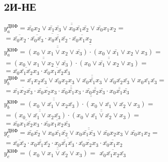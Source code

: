 \documentclass{bmstu}
\begin{document}
	\subsection{2И-НЕ}	
	$y^{\text{ДНФ}}_a = \overline{\overline{\bar{x_0} x_2 \vee \bar{x_1} \bar{x_3} \vee x_0 \bar{x_1} \bar{x_2} \vee \bar{x_0} x_1 x_2}} =$ \\
	$= \overline{\overline{\bar{x_0} x_2} \cdot \overline{\bar{x_0} \bar{x_3}} \cdot \overline{x_0 \bar{x_1} \bar{x_2}} \cdot \overline{\bar{x_0} x_1 x_2}}$ \\
	$y^{\text{КНФ}}_a = \overline{\overline{\overline{\overline{(x_0 \vee x_1 \vee x_2 \vee \bar{x_3})}} \cdot (x_0 \vee \bar{x_1} \vee x_2 \vee x_3)}} = $ \\
	$= \overline{\overline{(x_0 \vee x_1 \vee x_2 \vee \bar{x_3})}} \cdot \overline{\overline{(x_0 \vee \bar{x_1} \vee x_2 \vee x_3)}} = $ \\
	$= \overline{\bar{x_0} \bar{x_1} \bar{x_2} x_3} \cdot \overline{\bar{x_0} x_1 \bar{x_2} \bar{x_3}}$ \\
	
	$y^{\text{ДНФ}}_b = \overline{\overline{\bar{x_1} x_2 \bar{x_3} \vee \bar{x_0} x_2 x_3 \vee \bar{x_0} \bar{x_1} x_3 \vee \bar{x_0} \bar{x_2} \bar{x_3} \vee x_0 \bar{x_1} \bar{x_3}}} = $ \\
	$= \overline{\overline{\bar{x_1} x_2 \bar{x_3}} \cdot\overline{\bar{x_0} x_2 x_3} \cdot\overline{\bar{x_0} \bar{x_1} x_3} \cdot\overline{\bar{x_0} \bar{x_2} \bar{x_3}} \cdot \overline{x_0 \bar{x_1} \bar{x_3}}}$ \\
	$y^{\text{КНФ}}_b = \overline{\overline{\overline{\overline{(x_0 \vee \bar{x_1} \vee x_2 \bar{x_3})}} \cdot(x_0 \vee \bar{x_1} \vee \bar{x_2} \vee x_3) =}}$ \\
	$= \overline{\overline{(x_0 \vee \bar{x_1} \vee x_2 \bar{x_3})}} \cdot\overline{\overline{(x_0 \vee \bar{x_1} \vee \bar{x_2} \vee x_3)}} =$ \\
	$= \overline{\bar{x_0} x_1 \bar{x_2} x_3} \cdot \overline{\bar{x_0} x_1 x_2 \bar{x_3}}$ \\
	
	$y^{\text{ДНФ}}_c = \overline{\overline{\bar{x_0} \bar{x_2} \vee x_0 \bar{x_1} \bar{x_2} \vee x_0 \bar{x_1} \bar{x_3} \vee\bar{x_0} x_2 x_3 \vee\bar{x_0} x_1 x_2}} =$ \\
	$= \overline{\overline{\bar{x_0} \bar{x_2}} \cdot\overline{x_0 \bar{x_1} \bar{x_2}} \cdot\overline{x_0 \bar{x_1} \bar{x_3}} \cdot\overline{\bar{x_0} x_2 x_3} \cdot \overline{\bar{x_0} x_1 x_2}}$ \\
	$y^{\text{КНФ}}_c = \overline{\overline{(x_0 \vee x_1 \vee \bar{x_2} \vee x_3)}} =$ $ \overline{\bar{x_0} \bar{x_1} x_2 \bar{x_3}}$ \\
	
\end{document}
